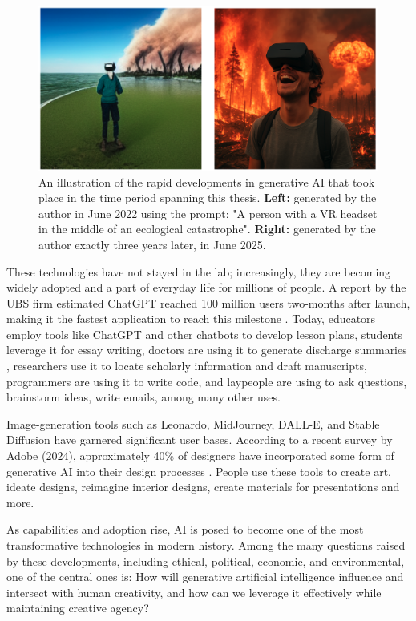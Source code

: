 \begin{figure}
    \centering
    \includegraphics[width=1\linewidth]{comparisonimages.png}
    \caption{An illustration of the rapid developments in generative AI that took place in the time period spanning this thesis. \textbf{Left:} generated by the author in June 2022 using the prompt: "A person with a VR headset in the middle of an ecological catastrophe". \textbf{Right:} generated by the author exactly three years later, in June 2025.}
    \label{fig:enter-label}
\end{figure}

These technologies have not stayed in the lab; increasingly, they are becoming widely adopted and a part of everyday life for millions of people. A report by the UBS firm estimated ChatGPT reached 100 million users two-months after launch, making it the fastest application to reach this milestone \cite{Hu2023-ie}. Today, educators employ tools like ChatGPT and other chatbots to develop lesson plans, students leverage it for essay writing, doctors are using it to generate discharge summaries \cite{Patel2023-fg}, researchers use it to locate scholarly information and draft manuscripts, programmers are using it to write code, and laypeople are using to ask questions, brainstorm ideas, write emails, among many other uses. 

Image-generation tools such as Leonardo, MidJourney, DALL-E, and Stable Diffusion have garnered significant user bases. According to a recent survey by Adobe (2024), approximately 40\% of designers have incorporated some form of generative AI into their design processes \cite{Offerman2024-lf}. People use these tools to create art, ideate designs, reimagine interior designs, create materials for presentations and more. 

As capabilities and adoption rise, AI is posed to become one of the most transformative technologies in modern history. Among the many questions raised by these developments, including ethical, political, economic, and environmental, one of the central ones is: How will generative artificial intelligence influence and intersect with human creativity, and how can we leverage it effectively while maintaining creative agency?

